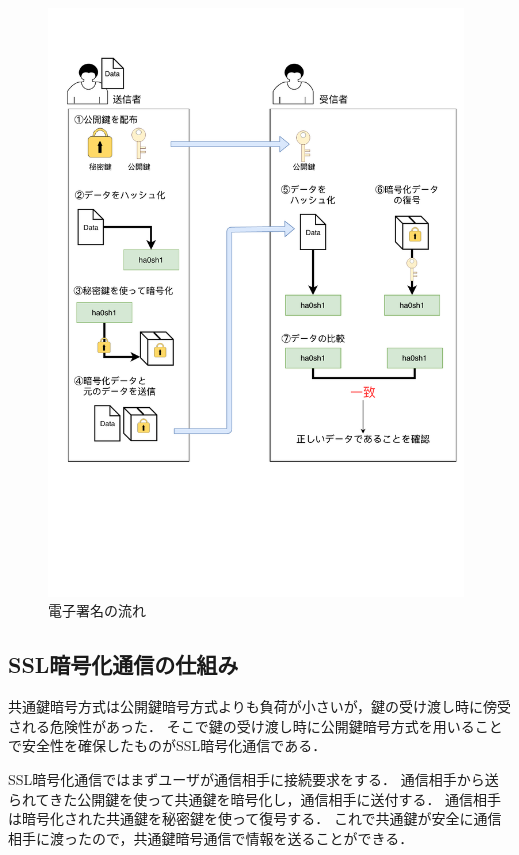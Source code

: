 \documentclass[a4j,12pt]{jsarticle}
\begin{document}
\begin{figure}[H]
\centering
\includegraphics[mediaboxonly=/CropBox,width=11cm]{shomei.pdf}
\caption{電子署名の流れ}
\label{fig:no}
\end{figure} 





\subsection{SSL暗号化通信の仕組み}
共通鍵暗号方式は公開鍵暗号方式よりも負荷が小さいが，鍵の受け渡し時に傍受される危険性があった．
そこで鍵の受け渡し時に公開鍵暗号方式を用いることで安全性を確保したものがSSL暗号化通信である．

SSL暗号化通信ではまずユーザが通信相手に接続要求をする．
通信相手から送られてきた公開鍵を使って共通鍵を暗号化し，通信相手に送付する．
通信相手は暗号化された共通鍵を秘密鍵を使って復号する．
これで共通鍵が安全に通信相手に渡ったので，共通鍵暗号通信で情報を送ることができる．
\end{document}
